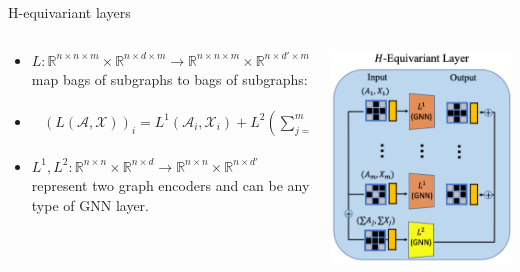 \documentclass[aspectratio=169,mathserif]{beamer}  %
\newcommand{\R}{\mathbb{R}}
\begin{document}
\begin{frame}{H-equivariant layers}

\begin{columns}[T]
\begin{column}{0.55\textwidth}
\begin{itemize}[<+->]
    \item $L:\R^{n\times n \times m}\times \R^{n\times d\times m} \to \R^{n\times n \times m}\times \R^{n\times d' \times m}$ map bags of subgraphs to bags of subgraphs:
    \item 
        \begin{eqnarray*}
        \begin{aligned}
        (L(\mathcal{A,X}))_i=L^1(\mathcal{A}_i,\mathcal{X}_i)+L^2(\sum_{j=1}^{m}A_j,\sum_{j=1}^{m}X_j)
        \end{aligned}    
        \end{eqnarray*}
    \item $L^1,L^2:\R^{n\times n}\times \R^{n\times d}\to \R^{n\times n}\times \R^{n\times d'}$ represent two graph encoders and can be any type of GNN layer. 
\end{itemize}
\end{column}
\begin{column}{0.4\textwidth}
    \includegraphics[width=\linewidth]{figure6.png}
\end{column}
\end{columns}

\end{frame}
\end{document}
